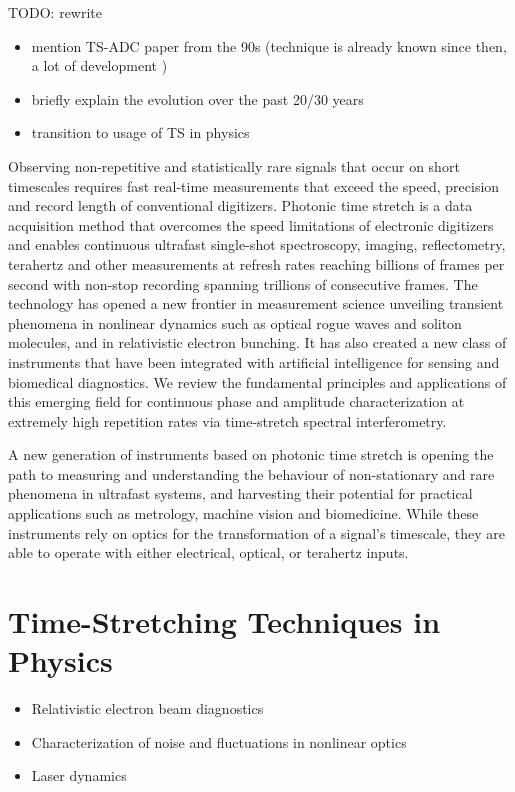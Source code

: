 TODO: rewrite
\begin{itemize}
	\item mention TS-ADC paper from the 90s (technique is already known since then, a lot of development )
	\item briefly explain the evolution over the past 20/30 years
	\item transition to usage of TS in physics
\end{itemize}

Observing non-repetitive and statistically rare signals that occur on short timescales requires fast real-time measurements that exceed the speed, precision and record length of conventional digitizers. Photonic time stretch is a data acquisition method that overcomes the speed limitations of electronic digitizers and enables continuous ultrafast single-shot spectroscopy, imaging, reflectometry, terahertz and other measurements at refresh rates reaching billions of frames per second with non-stop recording spanning trillions of consecutive frames. The technology has opened a new frontier in measurement science unveiling transient phenomena in nonlinear dynamics such as optical rogue waves and soliton molecules, and in relativistic electron bunching. It has also created a new class of instruments that have been integrated with artificial intelligence for sensing and biomedical diagnostics. We review the fundamental principles and applications of this emerging field for continuous phase and amplitude characterization at extremely high repetition rates via time-stretch spectral interferometry.

A new generation of instruments based on photonic time stretch is opening the path to measuring and understanding the behaviour of non-stationary and rare phenomena in ultrafast systems, and harvesting their potential for practical applications such as metrology, machine vision and biomedicine. While these instruments rely on optics for the transformation of a signal's timescale, they are able to operate with either electrical, optical, or terahertz inputs. \cite{szwaj}




\section{Time-Stretching Techniques in Physics}
\begin{itemize}
	\item Relativistic electron beam diagnostics
	\item Characterization of noise and fluctuations in nonlinear optics
	\item Laser dynamics
\end{itemize}


